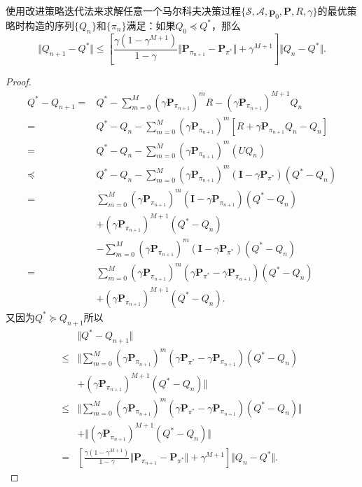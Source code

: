 \begin{theorem}[改进策略迭代法的收敛率]
    使用改进策略迭代法来求解任意一个马尔科夫决策过程$\{\mathcal{S}, \mathcal{A}, \mathbf{p}_0, \mathbf{P}, R, \gamma\}$的最优策略时构造的序列$\{Q_n\}$和$\{\pi_n\}$满足：如果$Q_0 \preceq Q^*$，那么
    \begin{equation}
        \Vert Q_{n+1} - Q^* \Vert
        \le
        \left[
            \frac{\gamma(1 - \gamma^{M+1})}{1 - \gamma}
            \Vert \mathbf{P}_{\pi_{n+1}} - \mathbf{P}_{\pi^*}\Vert
            + \gamma^{M+1}
        \right]
        \Vert Q_n - Q^* \Vert.
    \end{equation}
\end{theorem}
\begin{proof}
    \begin{align*}
    Q^* - Q_{n+1}
    =& Q^* - \sum^{M}_{m=0}(\gamma \mathbf{P}_{\pi_{n+1}})^m R 
    - (\gamma \mathbf{P}_{\pi_{n+1}})^{M+1}Q_{n}\\
    =& Q^* - Q_n - \sum^{M}_{m=0}(\gamma \mathbf{P}_{\pi_{n+1}})^m 
    [R + \gamma \mathbf{P}_{\pi_{n+1}} Q_n - Q_n]\\
    =& Q^* - Q_n - \sum^{M}_{m=0}(\gamma \mathbf{P}_{\pi_{n+1}})^m (UQ_n)\\
    \preceq& Q^* - Q_n - \sum^{M}_{m=0}(\gamma \mathbf{P}_{\pi_{n+1}})^m 
    (\mathbf{I} - \gamma \mathbf{P}_{\pi^*})(Q^* - Q_n)\\
    =& \sum^M_{m=0}(\gamma \mathbf{P}_{\pi_{n+1}})^m(\mathbf{I} 
    - \gamma \mathbf{P}_{\pi_{n+1}}) (Q^* - Q_n) \\ 
    & + (\gamma \mathbf{P}_{\pi_{n+1}})^{M+1}(Q^* - Q_n)\\
    & - \sum^{M}_{m=0}(\gamma \mathbf{P}_{\pi_{n+1}})^m 
    (\mathbf{I} - \gamma \mathbf{P}_{\pi^*})(Q^* - Q_n)\\
    =& \sum^M_{m=0}(\gamma\mathbf{P}_{\pi_{n+1}})^m(\gamma \mathbf{P}_{\pi^*} 
    - \gamma \mathbf{P}_{\pi_{n+1}})(Q^* - Q_n)\\
    & + (\gamma \mathbf{P}_{\pi_{n+1}})^{M+1}(Q^* - Q_n).
    \end{align*}
    又因为$Q^* \succeq Q_{n+1}$所以
    \begin{align*}
        &\Vert Q^* - Q_{n+1} \Vert\\
        \le& \big\Vert
        \sum^M_{m=0}(\gamma\mathbf{P}_{\pi_{n+1}})^m(\gamma \mathbf{P}_{\pi^*} 
        - \gamma \mathbf{P}_{\pi_{n+1}})(Q^* - Q_n)\\
        & + (\gamma \mathbf{P}_{\pi_{n+1}})^{M+1}(Q^* - Q_n)
        \big\Vert\\
        \le& \big\Vert
        \sum^M_{m=0}(\gamma\mathbf{P}_{\pi_{n+1}})^m(\gamma \mathbf{P}_{\pi^*} 
        - \gamma \mathbf{P}_{\pi_{n+1}})(Q^* - Q_n) \big\Vert\\
        & + \big\Vert(\gamma \mathbf{P}_{\pi_{n+1}})^{M+1}(Q^* - Q_n)
        \big\Vert\\
        =& 
        \left[
            \frac{\gamma(1 - \gamma^{M+1})}{1 - \gamma}
            \Vert \mathbf{P}_{\pi_{n+1}} - \mathbf{P}_{\pi^*}\Vert
            + \gamma^{M+1}
        \right]
        \Vert Q_n - Q^* \Vert.
    \end{align*}
\end{proof}

